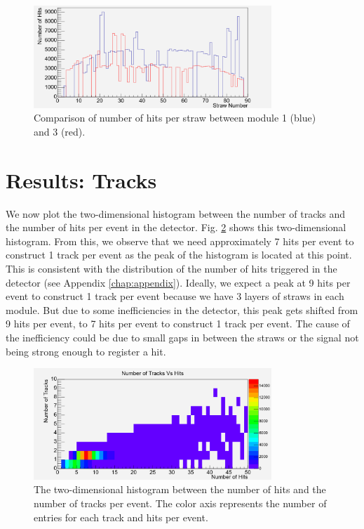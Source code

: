 \documentclass[a4paper]{report}
\numberwithin{equation}{section}
\begin{document}
\begin{figure}[!h]
	\centering
	\includegraphics[width=0.8\textwidth]{hitsperstraw_m1m3.png}
	\caption{Comparison of number of hits per straw between module 1 (blue) and 3 (red). }
	\label{fig:tracksvshits_comp}
\end{figure}

\section{Results: Tracks}

We now plot the two-dimensional histogram between the number of tracks and the number of hits per event in the detector. Fig. \ref{fig:tracksvshits}
shows this two-dimensional histogram. From this, we observe that we need approximately 7 hits per event to construct 1 track per event
as the peak of the histogram is located at this point. This is consistent with the distribution of the number of hits triggered in 
the detector (see Appendix \ref{chap:appendix}). Ideally, we expect a peak at 9 hits per event to construct 1 track per event because we have 3 layers of straws in each module. But due to some inefficiencies in the detector, this peak gets shifted from 9 hits per event, to 7 hits per event to construct 1 track per event. The cause of the inefficiency could be due to small gaps in between the straws or the signal not being strong enough to register a hit. 

\begin{figure}[!h]
	\centering
	\includegraphics[width=0.8\textwidth]{trackvshits.png}
	\caption{The two-dimensional histogram between the number of hits and the number of tracks per event. 
			The color axis represents the number of entries for each track and hits per event.}
	\label{fig:tracksvshits}
\end{figure}
\end{document}

